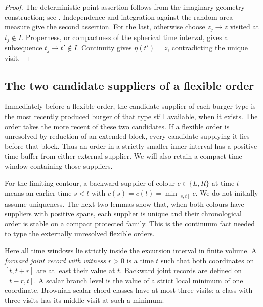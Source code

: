 \documentclass[11pt]{article}
\numberwithin{equation}{section}
\theoremstyle{definition}
\theoremstyle{remark}
\newcommand{\1}{\mathbf 1}
\begin{document}
\begin{proof}
The deterministic-point assertion follows from the imaginary-geometry
construction; see \cite[Section 2.4, property (vi)]{BorgaGwynneSunPermutons}.
Independence and integration against the random area measure give the
second assertion.  For the last, otherwise choose $z_j\to z$ visited at
$t_j\notin I$.  Properness, or compactness of the spherical time interval,
gives a subsequence $t_j\to t'\notin I$.  Continuity gives
$\eta(t')=z$, contradicting the unique visit.
\end{proof}

\subsection{The two candidate suppliers of a flexible order}

Immediately before a flexible order, the candidate supplier of each
burger type is the most recently produced burger of that type still
available, when it exists.  The order takes the more recent of these
two candidates.  If a flexible order is unresolved by reduction of an
extended block, every candidate supplying it lies before that block.
Thus an order in a strictly smaller inner interval has a positive time
buffer from either external supplier.  We will also retain a compact
time window containing those suppliers.

For the limiting contour, a backward supplier of colour $c\in\{L,R\}$
at time $t$ means an earlier time $s<t$ with
$c(s)=c(t)=\min_{[s,t]}c$.  We do not initially assume uniqueness.
The next two lemmas show that, when both colours have suppliers with
positive spans, each supplier is unique and their chronological order
is stable on a compact protected family.  This is the continuum fact
needed to type the externally unresolved flexible orders.

Here all time windows lie strictly inside the excursion interval in finite
volume.  A \emph{forward joint record with witness $r>0$} is a time $t$
such that both coordinates on $[t,t+r]$ are at least their value at $t$.
Backward joint records are defined on $[t-r,t]$.  A scalar branch level is
the value of a strict local minimum of one coordinate.  Brownian scalar
chord classes have at most three visits; a class with three visits has
its middle visit at such a minimum.
\end{document}
